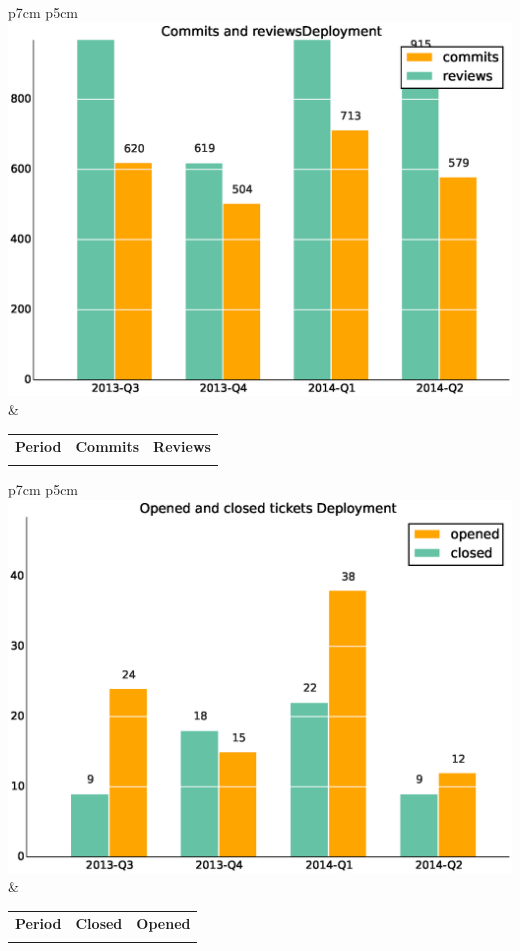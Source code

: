 \documentclass[a4wide,11pt]{report}
\begin{document}
\begin{tabular}{p{7cm} p{5cm}}
    \vspace{0pt} 
    \includegraphics[scale=.35]{figs/commitsDeployment.eps}
    & 
    \vspace{0pt}
    \begin{tabular}{l|r|r|}%
    \bfseries Period & \bfseries Commits & \bfseries Reviews %
    \csvreader[head to column names]{data/commitsDeployment.csv}{}%
    {\\ & \commits & \submitted}
    \end{tabular}
\end{tabular}

\begin{tabular}{p{7cm} p{5cm}}
    \vspace{0pt} 
    \includegraphics[scale=.35]{figs/closedDeployment.eps}
    & 
    \vspace{0pt}
    \begin{tabular}{l|r|r|}%
\bfseries Period & \bfseries Closed & \bfseries Opened
    \csvreader[head to column names]{data/closedDeployment.csv}{}%
    {\\ & \closed & \opened}
    \end{tabular}
\end{tabular}
\end{document}
